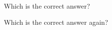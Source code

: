 \documentclass{exam}
\begin{document}
\begin{mcquestions}
\question Which is the correct answer?
\traceon
\begin{mcanswers}
\end{mcanswers}
\traceoff
\question Which is the correct answer again?
\begin{mcanswers}
\end{mcanswers}
\end{mcquestions}
\end{document}
